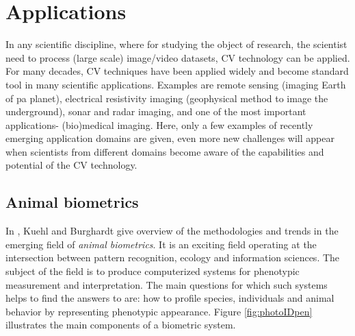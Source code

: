 \section{Applications}
\label{sec:app}

In any scientific discipline, where for studying the object of research, the scientist need to process (large scale) image/video datasets, CV technology can be applied.  For many decades, CV techniques have been applied widely and become standard tool in many scientific applications. Examples are remote sensing (imaging Earth of pa planet), electrical resistivity imaging (geophysical method to image the underground), sonar and radar imaging, and one of the most important applications- (bio)medical imaging. Here, only a few examples of recently emerging application domains are given, even more new challenges will appear when scientists from different domains become aware of the capabilities and potential of the CV technology.

\subsection{Animal biometrics}
\label{sec:anim_biom}
In \cite{Kuehl2013}, Kuehl and Burghardt give overview of the methodologies and trends in the emerging field of {\em animal biometrics}. It is an exciting field operating at the intersection between pattern recognition, ecology and information sciences. The subject of the field is to produce computerized systems for phenotypic measurement and interpretation. The main questions for which such systems helps to find the answers to are: how to profile species, individuals and animal behavior by representing phenotypic appearance. Figure \ref{fig:photoIDpen} illustrates the main components of a biometric system. 

